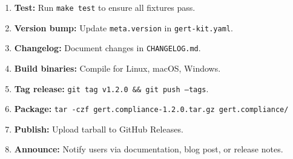 \begin{enumerate}
  \item \textbf{Test:} Run \texttt{make test} to ensure all fixtures pass.
  \item \textbf{Version bump:} Update \texttt{meta.version} in \texttt{gert-kit.yaml}.
  \item \textbf{Changelog:} Document changes in \texttt{CHANGELOG.md}.
  \item \textbf{Build binaries:} Compile for Linux, macOS, Windows.
  \item \textbf{Tag release:} \texttt{git tag v1.2.0 \&\& git push --tags}.
  \item \textbf{Package:} \texttt{tar -czf gert.compliance-1.2.0.tar.gz gert.compliance/}
  \item \textbf{Publish:} Upload tarball to GitHub Releases.
  \item \textbf{Announce:} Notify users via documentation, blog post, or release notes.
\end{enumerate}
